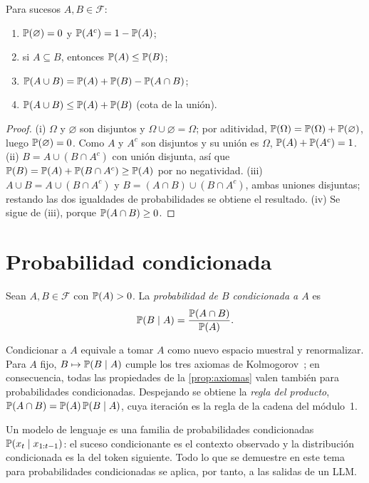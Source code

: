 \begin{proposicion}\label{prop:axiomas}
Para sucesos $A,B\in\mathcal{F}$:
\begin{enumerate}
  \item $\mathbb{P}(\varnothing)=0$ y $\mathbb{P}(A^{c})=1-\mathbb{P}(A)$;
  \item si $A\subseteq B$, entonces $\mathbb{P}(A)\le\mathbb{P}(B)$;
  \item $\mathbb{P}(A\cup B)=\mathbb{P}(A)+\mathbb{P}(B)-\mathbb{P}(A\cap B)$;
  \item $\mathbb{P}(A\cup B)\le\mathbb{P}(A)+\mathbb{P}(B)$ (cota de la unión).
\end{enumerate}
\end{proposicion}

\begin{proof}
(i) $\Omega$ y $\varnothing$ son disjuntos y $\Omega\cup\varnothing=\Omega$; por aditividad, $\mathbb{P}(\Omega)=\mathbb{P}(\Omega)+\mathbb{P}(\varnothing)$, luego $\mathbb{P}(\varnothing)=0$. Como $A$ y $A^{c}$ son disjuntos y su unión es $\Omega$, $\mathbb{P}(A)+\mathbb{P}(A^{c})=1$. (ii) $B=A\cup(B\cap A^{c})$ con unión disjunta, así que $\mathbb{P}(B)=\mathbb{P}(A)+\mathbb{P}(B\cap A^{c})\ge\mathbb{P}(A)$ por no negatividad. (iii) $A\cup B=A\cup(B\cap A^{c})$ y $B=(A\cap B)\cup(B\cap A^{c})$, ambas uniones disjuntas; restando las dos igualdades de probabilidades se obtiene el resultado. (iv) Se sigue de (iii), porque $\mathbb{P}(A\cap B)\ge 0$.
\end{proof}

\section{Probabilidad condicionada}

\begin{definicion}
Sean $A,B\in\mathcal{F}$ con $\mathbb{P}(A)>0$. La \emph{probabilidad de $B$ condicionada a $A$} es
\[
\mathbb{P}(B\mid A)=\frac{\mathbb{P}(A\cap B)}{\mathbb{P}(A)}.
\]
\end{definicion}

Condicionar a $A$ equivale a tomar $A$ como nuevo espacio muestral y renormalizar. Para $A$ fijo, $B\mapsto\mathbb{P}(B\mid A)$ cumple los tres axiomas de Kolmogorov~\cite[§1.3]{bt}; en consecuencia, todas las propiedades de la \cref{prop:axiomas} valen también para probabilidades condicionadas. Despejando se obtiene la \emph{regla del producto}, $\mathbb{P}(A\cap B)=\mathbb{P}(A)\,\mathbb{P}(B\mid A)$, cuya iteración es la regla de la cadena del módulo~1.

\begin{observacion}
Un modelo de lenguaje es una familia de probabilidades condicionadas $\mathbb{P}(x_t\mid x_{1:t-1})$: el suceso condicionante es el contexto observado y la distribución condicionada es la del token siguiente. Todo lo que se demuestre en este tema para probabilidades condicionadas se aplica, por tanto, a las salidas de un LLM.
\end{observacion}

